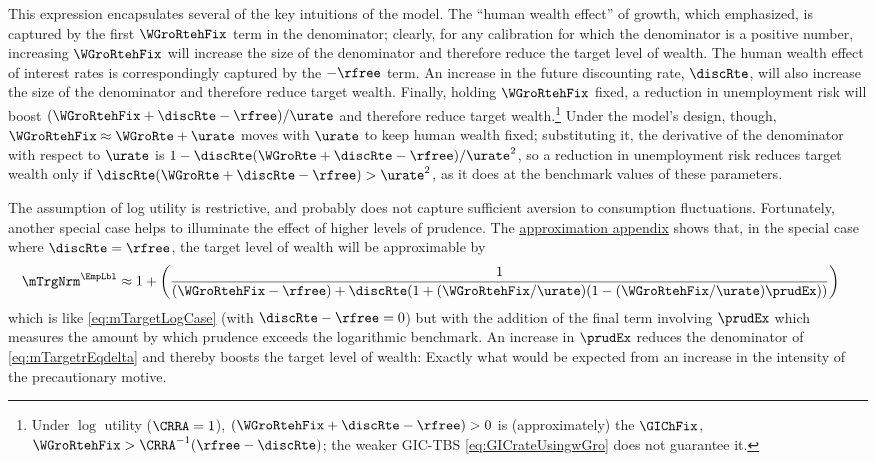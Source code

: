 \documentclass{econark}
\begin{document}
This expression encapsulates several of the key intuitions of the model.  The
``human wealth effect'' of growth, which \citet{summersCapTax} emphasized, is captured by the first $\WGroRtehFix$ term in the denominator;
clearly, for any calibration for which the denominator is a positive number, increasing
$\WGroRtehFix$ will increase the size of the denominator and therefore reduce the target
level of wealth.  The human wealth effect of interest rates is  correspondingly captured
by the $-\rfree$ term.  An increase in the future discounting rate, $\discRte$, will also
increase the size of the denominator and therefore reduce target wealth.  Finally,
holding $\WGroRtehFix$ fixed, a reduction in unemployment risk will boost $(\WGroRtehFix+\discRte-\rfree)/\urate$ and therefore reduce target
wealth.\footnote{Under $\log$ utility ($\CRRA=1$), $(\WGroRtehFix+\discRte-\rfree) > 0$ is (approximately) the $\GIChFix$, $\WGroRtehFix > \CRRA^{-1}(\rfree-\discRte)$; the weaker GIC-TBS \eqref{eq:GICrateUsingwGro} does not guarantee it.}  Under the model's design, though, $\WGroRtehFix \approx \WGroRte+\urate$ moves with $\urate$ to keep human wealth fixed; substituting it, the derivative of the denominator with respect to $\urate$ is $1-\discRte(\WGroRte+\discRte-\rfree)/\urate^{2}$, so a reduction in unemployment risk reduces target wealth only if $\discRte(\WGroRte+\discRte-\rfree) > \urate^{2}$, as it does at the benchmark values of these parameters.

The assumption of log utility is restrictive, and probably does not capture sufficient aversion to consumption fluctuations.  Fortunately, another special case helps to illuminate the effect of higher levels of prudence.  The \hyperref[sec:mTargApprox]{approximation appendix} shows that, in the special case where $\discRte=\rfree$, the target level of wealth will be approximable by
\begin{equation}\begin{gathered}\begin{aligned}
 \mTrgNrm^{\EmpLbl} & \approx  1 + \left(\frac{1}{(\WGroRtehFix-\rfree)+\discRte(1+(\WGroRtehFix/\urate)(1-(\WGroRtehFix/\urate)\prudEx))}\right) \label{eq:mTargetrEqdelta}
\end{aligned}\end{gathered}\end{equation}
which is like \eqref{eq:mTargetLogCase} (with $\discRte-\rfree=0$) but with the addition of the final term involving $\prudEx$ which measures the amount by which prudence exceeds the logarithmic benchmark.  An increase in $\prudEx$ reduces the denominator of \eqref{eq:mTargetrEqdelta} and thereby boosts the target level of wealth: Exactly what would be expected from an increase in the intensity of the precautionary motive.
\end{document}
